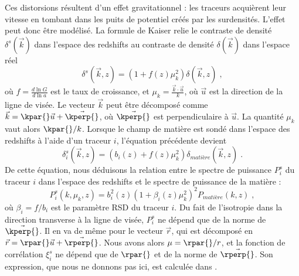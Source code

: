 Ces distorsions résultent d'un effet gravitationnel : les traceurs acquièrent leur vitesse en tombant dans les puits de potentiel créés par les surdensités. L'effet peut donc être modélisé.
La formule de Kaiser \autocite{Kaiser1987} relie le contraste de densité $\delta^s(\vec k)$ dans l'espace des redshifts au contraste de densité $\delta(\vec k)$ dans l'espace réel
\begin{equation}
  \label{eq:kaiser}
  \delta^{s}(\vec k, z) = (1 + f(z) \mu_k^2) \delta(\vec k, z)  \; ,
\end{equation}
où $f = \displaystyle \frac{d \ln{G}}{d \ln{a}}$ est le taux de croissance, et $\mu_k = \displaystyle \frac{\vec k \cdot \vec u}{k}$, où $\vec u$ est la direction de la ligne de visée.
Le vecteur $\vec k$ peut être décomposé comme $\vec k = \kpar{} \vec u + \vec \kperp{}$, où $\vec \kperp{}$ est perpendiculaire à $\vec u$. La quantité $\mu_k$ vaut alors $\kpar{} / k$. 
Lorsque le champ de matière est sondé dans l'espace des redshifts à l'aide d'un traceur $i$, l'équation précédente devient
\begin{equation}
  \label{eq:kaiser2}
  \delta_i^{s}(\vec k, z) = (b_i(z) + f(z) \mu_k^2) \delta_{matière}(\vec k, z)  \; .
\end{equation}
De cette équation, nous déduisons la relation entre le spectre de puissance $P_{i}^{s}$ du traceur $i$ dans l'espace des redshifts et le spectre de puissance de la matière :
\begin{equation}
  \label{eq:kaiser3}
  P_{i}^s(k, \mu_k, z) = b_{i}^2(z)(1 + \beta_i(z) \mu_k^2)^2 P_{matière}(k, z)  \; ,
\end{equation}
où $\beta_i = f / b_i$ est le paramètre RSD du traceur $i$.
Du fait de l'isotropie dans la direction transverse à la ligne de visée, $P_i^s$ ne dépend que de la norme de $\vec \kperp{}$. Il en va de même pour le vecteur $\vec r$, qui est décomposé en $\vec r =  \rpar{} \vec u + \vec \rperp{}$. Nous avons alors $\mu = \rpar{} / r$, et la fonction de corrélation $\xi_i^s$ ne dépend que de $\rpar{}$ et de la norme de $\vec \rperp{}$. Son expression, que nous ne donnons pas ici, est calculée dans \textcite{Hamilton1992}.

